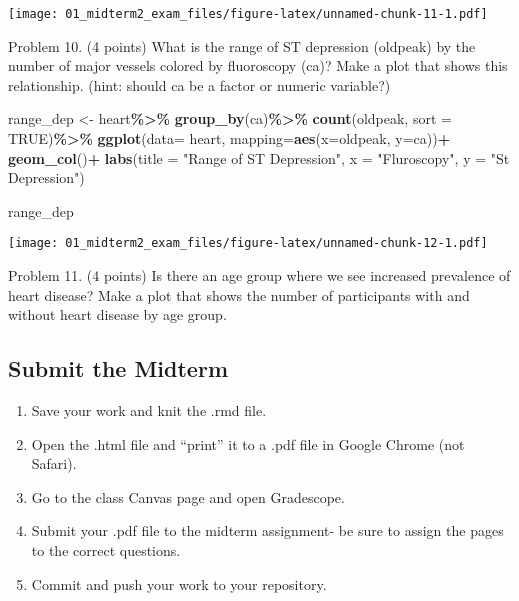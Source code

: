 \documentclass[
]{article}
\newenvironment{Shaded}{\begin{snugshade}}{\end{snugshade}}
\newcommand{\AttributeTok}[1]{\textcolor[rgb]{0.13,0.29,0.53}{#1}}
\newcommand{\ConstantTok}[1]{\textcolor[rgb]{0.56,0.35,0.01}{#1}}
\newcommand{\FunctionTok}[1]{\textcolor[rgb]{0.13,0.29,0.53}{\textbf{#1}}}
\newcommand{\NormalTok}[1]{#1}
\newcommand{\OtherTok}[1]{\textcolor[rgb]{0.56,0.35,0.01}{#1}}
\newcommand{\SpecialCharTok}[1]{\textcolor[rgb]{0.81,0.36,0.00}{\textbf{#1}}}
\newcommand{\StringTok}[1]{\textcolor[rgb]{0.31,0.60,0.02}{#1}}
\providecommand{\tightlist}{%
  \setlength{\itemsep}{0pt}\setlength{\parskip}{0pt}}
\begin{document}
\texttt{[image: 01\_midterm2\_exam\_files/figure-latex/unnamed-chunk-11-1.pdf]}

Problem 10. (4 points) What is the range of ST depression (oldpeak) by
the number of major vessels colored by fluoroscopy (ca)? Make a plot
that shows this relationship. (hint: should ca be a factor or numeric
variable?)

\begin{Shaded}
\begin{Highlighting}[]
\NormalTok{range\_dep }\OtherTok{\textless{}{-}}\NormalTok{ heart}\SpecialCharTok{\%\textgreater{}\%}
  \FunctionTok{group\_by}\NormalTok{(ca)}\SpecialCharTok{\%\textgreater{}\%}
  \FunctionTok{count}\NormalTok{(oldpeak, }\AttributeTok{sort =} \ConstantTok{TRUE}\NormalTok{)}\SpecialCharTok{\%\textgreater{}\%}
  \FunctionTok{ggplot}\NormalTok{(}\AttributeTok{data=}\NormalTok{ heart, }\AttributeTok{mapping=}\FunctionTok{aes}\NormalTok{(}\AttributeTok{x=}\NormalTok{oldpeak, }\AttributeTok{y=}\NormalTok{ca))}\SpecialCharTok{+}
  \FunctionTok{geom\_col}\NormalTok{()}\SpecialCharTok{+}
  \FunctionTok{labs}\NormalTok{(}\AttributeTok{title =} \StringTok{"Range of ST Depression"}\NormalTok{, }\AttributeTok{x =} \StringTok{"Fluroscopy"}\NormalTok{, }\AttributeTok{y =} \StringTok{"St Depression"}\NormalTok{)}

\NormalTok{range\_dep}
\end{Highlighting}
\end{Shaded}

\texttt{[image: 01\_midterm2\_exam\_files/figure-latex/unnamed-chunk-12-1.pdf]}

Problem 11. (4 points) Is there an age group where we see increased
prevalence of heart disease? Make a plot that shows the number of
participants with and without heart disease by age group.

\subsection{Submit the Midterm}\label{submit-the-midterm}

\begin{enumerate}
\def\labelenumi{\arabic{enumi}.}
\tightlist
\item
  Save your work and knit the .rmd file.\\
\item
  Open the .html file and ``print'' it to a .pdf file in Google Chrome
  (not Safari).\\
\item
  Go to the class Canvas page and open Gradescope.\\
\item
  Submit your .pdf file to the midterm assignment- be sure to assign the
  pages to the correct questions.\\
\item
  Commit and push your work to your repository.
\end{enumerate}
\end{document}
